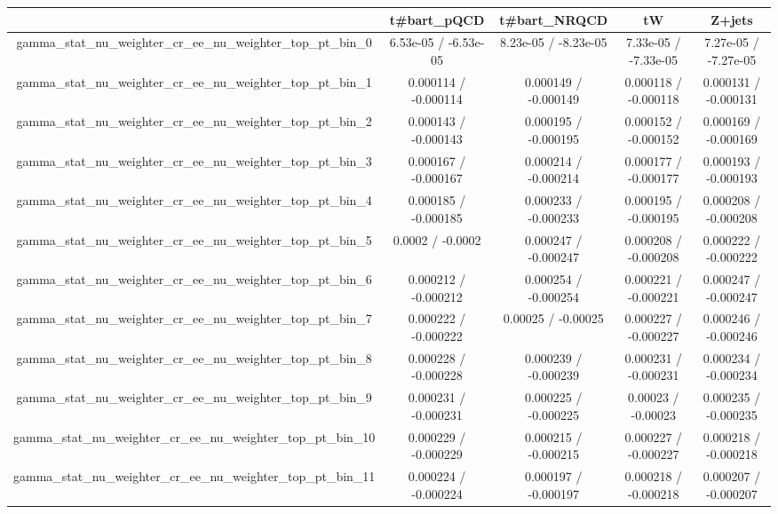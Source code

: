 \documentclass[10pt]{article}
\begin{document}
\begin{table}[htbp]
\begin{center}
\begin{tabular}{|c|c|c|c|c|}
\hline 
      & t#bar{t}_{pQCD}      & t#bar{t}_{NRQCD}      & tW      & Z+jets \\ 
\hline 
  gamma_stat_nu_weighter_cr_ee_nu_weighter_top_pt_bin_0 & 6.53e-05 / -6.53e-05 & 8.23e-05 / -8.23e-05 & 7.33e-05 / -7.33e-05 & 7.27e-05 / -7.27e-05 \\ 
  gamma_stat_nu_weighter_cr_ee_nu_weighter_top_pt_bin_1 & 0.000114 / -0.000114 & 0.000149 / -0.000149 & 0.000118 / -0.000118 & 0.000131 / -0.000131 \\ 
  gamma_stat_nu_weighter_cr_ee_nu_weighter_top_pt_bin_2 & 0.000143 / -0.000143 & 0.000195 / -0.000195 & 0.000152 / -0.000152 & 0.000169 / -0.000169 \\ 
  gamma_stat_nu_weighter_cr_ee_nu_weighter_top_pt_bin_3 & 0.000167 / -0.000167 & 0.000214 / -0.000214 & 0.000177 / -0.000177 & 0.000193 / -0.000193 \\ 
  gamma_stat_nu_weighter_cr_ee_nu_weighter_top_pt_bin_4 & 0.000185 / -0.000185 & 0.000233 / -0.000233 & 0.000195 / -0.000195 & 0.000208 / -0.000208 \\ 
  gamma_stat_nu_weighter_cr_ee_nu_weighter_top_pt_bin_5 & 0.0002 / -0.0002 & 0.000247 / -0.000247 & 0.000208 / -0.000208 & 0.000222 / -0.000222 \\ 
  gamma_stat_nu_weighter_cr_ee_nu_weighter_top_pt_bin_6 & 0.000212 / -0.000212 & 0.000254 / -0.000254 & 0.000221 / -0.000221 & 0.000247 / -0.000247 \\ 
  gamma_stat_nu_weighter_cr_ee_nu_weighter_top_pt_bin_7 & 0.000222 / -0.000222 & 0.00025 / -0.00025 & 0.000227 / -0.000227 & 0.000246 / -0.000246 \\ 
  gamma_stat_nu_weighter_cr_ee_nu_weighter_top_pt_bin_8 & 0.000228 / -0.000228 & 0.000239 / -0.000239 & 0.000231 / -0.000231 & 0.000234 / -0.000234 \\ 
  gamma_stat_nu_weighter_cr_ee_nu_weighter_top_pt_bin_9 & 0.000231 / -0.000231 & 0.000225 / -0.000225 & 0.00023 / -0.00023 & 0.000235 / -0.000235 \\ 
  gamma_stat_nu_weighter_cr_ee_nu_weighter_top_pt_bin_10 & 0.000229 / -0.000229 & 0.000215 / -0.000215 & 0.000227 / -0.000227 & 0.000218 / -0.000218 \\ 
  gamma_stat_nu_weighter_cr_ee_nu_weighter_top_pt_bin_11 & 0.000224 / -0.000224 & 0.000197 / -0.000197 & 0.000218 / -0.000218 & 0.000207 / -0.000207 \\ 

\end{tabular}
\end{center}
\end{table}
\end{document}

